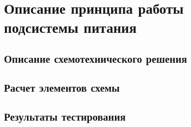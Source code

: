 \chapter{Описание принципа работы подсистемы питания}
\section{Описание схемотехнического решения}
\hspace{1cm} 


\section{Расчет элементов схемы}
\hspace{1cm} 

\section{Результаты тестирования}
\hspace{1cm} 
